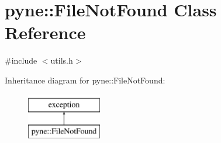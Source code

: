 \hypertarget{classpyne_1_1_file_not_found}{\section{pyne\-:\-:File\-Not\-Found Class Reference}
\label{classpyne_1_1_file_not_found}
}


{\ttfamily \#include $<$utils.\-h$>$}

Inheritance diagram for pyne\-:\-:File\-Not\-Found\-:\begin{figure}[H]
\begin{center}
\leavevmode
\includegraphics[height=2.000000cm]{classpyne_1_1_file_not_found}
\end{center}
\end{figure}
